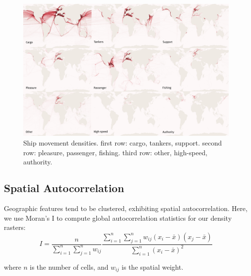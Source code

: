 \begin{figure}[htbp]
  \centerline{\includegraphics[width=160mm]{figures/9fold-map-labeled-resized.pdf}}
  \caption{Ship movement densities. first row: cargo, tankers, support. second row:  pleasure, passenger, fishing. third row: other, high-speed, authority.}
  \label{fig:9fold-ship-maps}
\end{figure}


\subsection{Spatial Autocorrelation}

Geographic features tend to be clustered, exhibiting spatial autocorrelation. Here, we use Moran's I to compute global autocorrelation statistics for our density rasters:
\begin{equation}
I = \frac{n}{\sum_{i=1}^{n}\sum_{j=1}^{n}w_{ij}}
\frac{\sum_{i=1}^{n}\sum_{j=1}^{n}w_{ij}(x_i-\bar{x})(x_j-\bar{x})}{\sum_{i=1}^{n}(x_i - \bar{x})^2}
\end{equation}

where $n$ is the number of cells, and $w_{ij}$ is the spatial weight.

